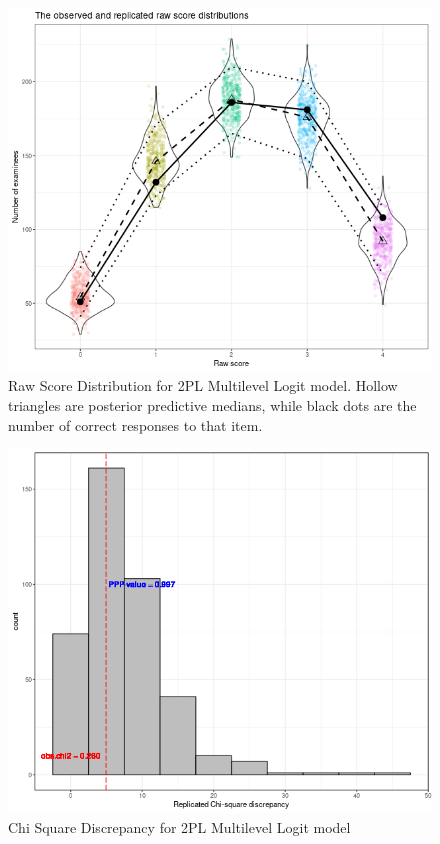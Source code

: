 \documentclass[12pt]{article}
\begin{document}
\begin{figure}[h]
\vspace{-0.5cm}
  \centering
  \includegraphics[width=1\columnwidth]{Plots/Plots_2PL_mlirt_Logit/raw_score_dist.png}
  \caption{Raw Score Distribution for 2PL Multilevel Logit model. Hollow triangles are posterior predictive medians, while black dots are the number of correct responses to that item.}
  \label{2pl_logit_mlirt_raw_score}
\end{figure}

\begin{figure}[h]
\vspace{-0.5cm}
  \centering
  \includegraphics[width=1\columnwidth]{Plots/Plots_2PL_mlirt_Logit/chi_square.png}
  \caption{Chi Square Discrepancy for 2PL Multilevel Logit model}
  \label{2pl_logit_mlirt_chi_squar}
\end{figure}
\end{document}

